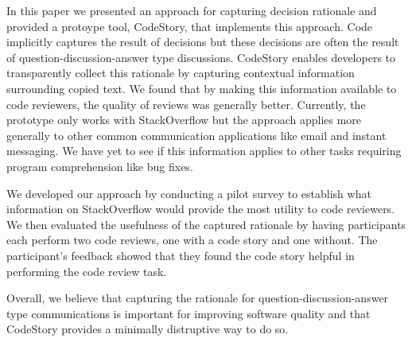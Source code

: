 \documentclass[../manifest.tex]{subfiles}
\begin{document}
In this paper we presented an approach for capturing decision rationale and provided a protoype tool, CodeStory, that implements this approach. Code implicitly captures the result of decisions but these decisions are often the result of question-discussion-answer type discussions. CodeStory enables developers to transparently collect this rationale by capturing contextual information surrounding copied text. We found that by making this information available to code reviewers, the quality of reviews was generally better. Currently, the prototype only works with StackOverflow but the approach applies more generally to other common communication applications like email and instant messaging. We have yet to see if this information applies to other tasks requiring program comprehension like bug fixes.

We developed our approach by conducting a pilot survey to establish what information on StackOverflow would provide the most utility to code reviewers. We then evaluated the usefulness of the captured rationale by having participants each perform two code reviews, one with a code story and one without. The participant's feedback showed that they found the code story helpful in performing the code review task.

Overall, we believe that capturing the rationale for question-discussion-answer type communications is important for improving software quality and that CodeStory provides a minimally distruptive way to do so.
\end{document}
